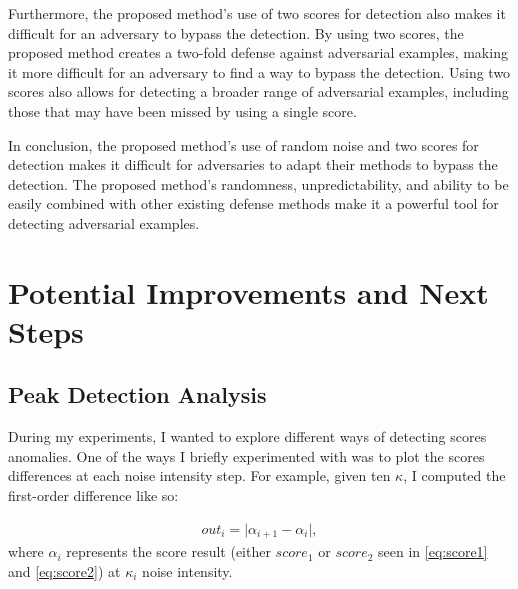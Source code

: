 Furthermore, the proposed method's use of two scores for detection also makes it
difficult for an adversary to bypass the detection. By using two scores, the
proposed method creates a two-fold defense against adversarial examples, making
it more difficult for an adversary to find a way to bypass the detection. Using
two scores also allows for detecting a broader range of adversarial examples,
including those that may have been missed by using a single score.

In conclusion, the proposed method's use of random noise and two scores for
detection makes it difficult for adversaries to adapt their methods to bypass
the detection. The proposed method's randomness, unpredictability, and ability
to be easily combined with other existing defense methods make it a powerful
tool for detecting adversarial examples.

\clearpage
\section{Potential Improvements and Next Steps}

\subsection{Peak Detection Analysis}
During my experiments, I wanted to explore different ways of detecting scores
anomalies. One of the ways I briefly experimented with was to plot the scores
differences at each noise intensity step. For example, given ten $\kappa$, I
computed the first-order difference like so:

\begin{align}
    \label{eq:first-order-diff}
    out_i= \lvert \alpha_{i+1} - \alpha_{i} \rvert,
\end{align}
where $\alpha_i$ represents the score result (either $score_1$ or $score_2$ seen
in \ref{eq:score1} and \ref{eq:score2}) at $\kappa_i$ noise intensity.

